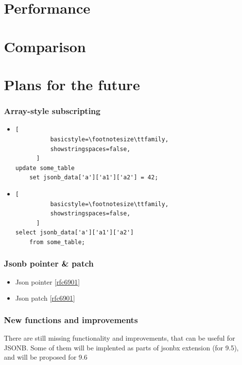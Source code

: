 \documentclass[14pt, compress, aspectratio=169]{beamer}
\begin{document}
\section{Performance}

\section{Comparison}

\section{Plans for the future}

\begin{frame}[fragile]
  \frametitle{Array-style subscripting}

  \begin{itemize}
      \item
      \begin{lstlisting}[
          basicstyle=\footnotesize\ttfamily,
          showstringspaces=false,
      ]
update some_table
    set jsonb_data['a']['a1']['a2'] = 42;

      \end{lstlisting}

      \item
      \begin{lstlisting}[
          basicstyle=\footnotesize\ttfamily,
          showstringspaces=false,
      ]
select jsonb_data['a']['a1']['a2']
    from some_table;

      \end{lstlisting}
  \end{itemize}

\end{frame}

\begin{frame}[fragile]
  \frametitle{Jsonb pointer \& patch}

  \begin{itemize}
      \item[\MVRightarrow] Json pointer [\href{http://tools.ietf.org/html/rfc6901}{rfc6901}]
      \item[\MVRightarrow] Json patch [\href{http://tools.ietf.org/html/rfc6902}{rfc6901}]
  \end{itemize}

\end{frame}

\begin{frame}[fragile]
  \frametitle{New functions and improvements}

  There are still missing functionality and improvements, that can be useful for JSONB.
  Some of them will be implented as parts of jsonbx extension (for 9.5), and will be proposed for 9.6
\end{frame}
\end{document}
